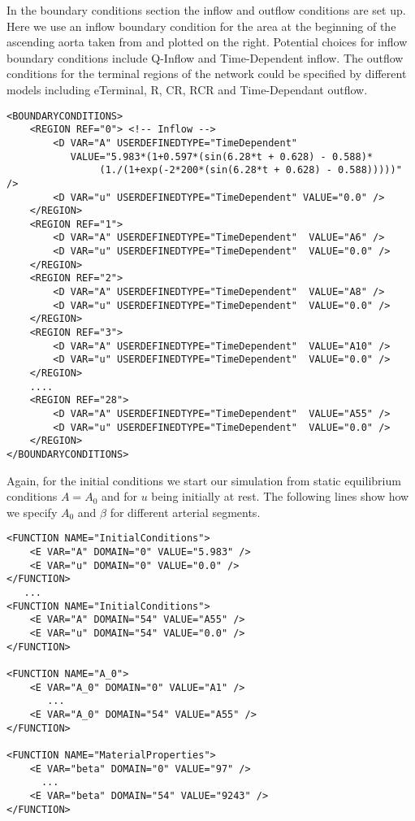In the boundary conditions section the inflow and outflow conditions are set up.
Here we use an inflow boundary condition for the area at the beginning of
the ascending aorta taken from \cite{ShFoPeFr03} and plotted on the
right. Potential choices for inflow boundary conditions include Q-Inflow
and Time-Dependent inflow. The outflow conditions for the terminal regions of
the network could be specified by different models including eTerminal, R, CR,
RCR and Time-Dependant outflow.

\begin{lstlisting}[style=XmlStyle]
<BOUNDARYCONDITIONS>
    <REGION REF="0"> <!-- Inflow -->
        <D VAR="A" USERDEFINEDTYPE="TimeDependent" 
           VALUE="5.983*(1+0.597*(sin(6.28*t + 0.628) - 0.588)*
                (1./(1+exp(-2*200*(sin(6.28*t + 0.628) - 0.588)))))" />
        <D VAR="u" USERDEFINEDTYPE="TimeDependent" VALUE="0.0" />
    </REGION>
    <REGION REF="1">  
        <D VAR="A" USERDEFINEDTYPE="TimeDependent"  VALUE="A6" />
        <D VAR="u" USERDEFINEDTYPE="TimeDependent"  VALUE="0.0" />
    </REGION>            
    <REGION REF="2"> 
        <D VAR="A" USERDEFINEDTYPE="TimeDependent"  VALUE="A8" />
        <D VAR="u" USERDEFINEDTYPE="TimeDependent"  VALUE="0.0" />
    </REGION>
    <REGION REF="3">   
        <D VAR="A" USERDEFINEDTYPE="TimeDependent"  VALUE="A10" />
        <D VAR="u" USERDEFINEDTYPE="TimeDependent"  VALUE="0.0" />
    </REGION>
    ....
    <REGION REF="28"> 
        <D VAR="A" USERDEFINEDTYPE="TimeDependent"  VALUE="A55" />
        <D VAR="u" USERDEFINEDTYPE="TimeDependent"  VALUE="0.0" />
    </REGION>
</BOUNDARYCONDITIONS>
\end{lstlisting}

Again, for the initial conditions we start our simulation from static
equilibrium conditions $A = A_0$ and for $u$ being initially at rest. The
following lines show how we specify $A_0$ and $\beta$ for different arterial
segments.
\begin{lstlisting}[style=XmlStyle]
<FUNCTION NAME="InitialConditions">
    <E VAR="A" DOMAIN="0" VALUE="5.983" />
    <E VAR="u" DOMAIN="0" VALUE="0.0" />
</FUNCTION>
   ...
<FUNCTION NAME="InitialConditions">
    <E VAR="A" DOMAIN="54" VALUE="A55" />
    <E VAR="u" DOMAIN="54" VALUE="0.0" />
</FUNCTION>

<FUNCTION NAME="A_0">
    <E VAR="A_0" DOMAIN="0" VALUE="A1" />
       ...
    <E VAR="A_0" DOMAIN="54" VALUE="A55" />
</FUNCTION>

<FUNCTION NAME="MaterialProperties"> 
    <E VAR="beta" DOMAIN="0" VALUE="97" />
      ...
    <E VAR="beta" DOMAIN="54" VALUE="9243" />
</FUNCTION>
\end{lstlisting}

